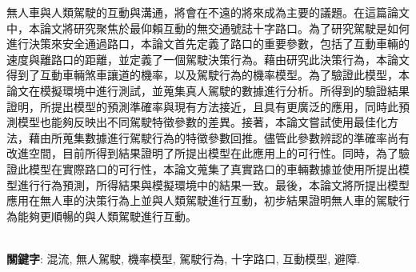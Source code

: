 無人車與人類駕駛的互動與溝通，將會在不遠的將來成為主要的議題。在這篇論文中，本論文將研究聚焦於最仰賴互動的無交通號誌十字路口。為了研究駕駛是如何進行決策來安全通過路口，本論文首先定義了路口的重要參數，包括了互動車輛的速度與離路口的距離，並定義了一個駕駛決策行為。藉由研究此決策行為，本論文得到了互動車輛煞車讓道的機率，以及駕駛行為的機率模型。為了驗證此模型，本論文在模擬環境中進行測試，並蒐集真人駕駛的數據進行分析。所得到的驗證結果證明，所提出模型的預測準確率與現有方法接近，且具有更廣泛的應用，同時此預測模型也能夠反映出不同駕駛特徵參數的差異。接著，本論文嘗試使用最佳化方法，藉由所蒐集數據進行駕駛行為的特徵參數回推。儘管此參數辨認的準確率尚有改進空間，目前所得到結果證明了所提出模型在此應用上的可行性。同時，為了驗證此模型在實際路口的可行性，本論文蒐集了真實路口的車輛數據並使用所提出模型進行行為預測，所得結果與模擬環境中的結果一致。最後，本論文將所提出模型應用在無人車的決策行為上並與人類駕駛進行互動，初步結果證明無人車的駕駛行為能夠更順暢的與人類駕駛進行互動。


~\\

\textbf{關鍵字}: 混流, 無人駕駛, 機率模型, 駕駛行為, 十字路口, 互動模型, 避障.